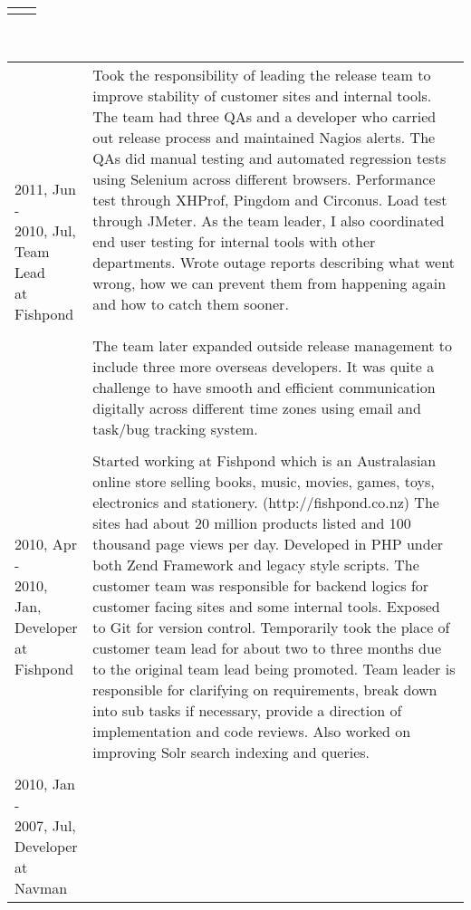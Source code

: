 \begin{resume}
\begin{tabular}{ll}
{}\end{tabular}\\
\begin{tabular}{ll}
\parbox[t]{30mm}{2011, Jun - \\ 2010, Jul,\\Team Lead\\at Fishpond} & \parbox[t]{116mm}{

Took the responsibility of leading the release team to improve stability of customer sites and internal tools. The team had three QAs and a developer who carried out release process and maintained Nagios alerts. The QAs did manual testing and automated regression tests using Selenium across different browsers. Performance test through XHProf, Pingdom and Circonus. Load test through JMeter. As the team leader, I also coordinated end user testing for internal tools with other departments. Wrote outage reports describing what went wrong, how we can prevent them from happening again and how to catch them sooner.
\\\\
The team later expanded outside release management to include three more overseas developers. It was quite a challenge to have smooth and efficient communication digitally across different time zones using email and task/bug tracking system.

}\\\\
\parbox[t]{30mm}{2010, Apr - \\ 2010, Jan,\\Developer\\at Fishpond} & \parbox[t]{116mm}{

Started working at Fishpond which is an Australasian online store selling books, music, movies, games, toys, electronics and stationery. (http://fishpond.co.nz) The sites had about 20 million products listed and 100 thousand page views per day. Developed in PHP under both Zend Framework and legacy style scripts. The customer team was responsible for backend logics for customer facing sites and some internal tools. Exposed to Git for version control. Temporarily took the place of customer team lead for about two to three months due to the original team lead being promoted. Team leader is responsible for clarifying on requirements, break down into sub tasks if necessary, provide a direction of implementation and code reviews. Also worked on improving Solr search indexing and queries. 

}\\\\
\parbox[t]{30mm}{2010, Jan - \\ 2007, Jul,\\Developer\\at Navman} & \parbox[t]{116mm}{

}
\end{tabular}
\end{resume}
